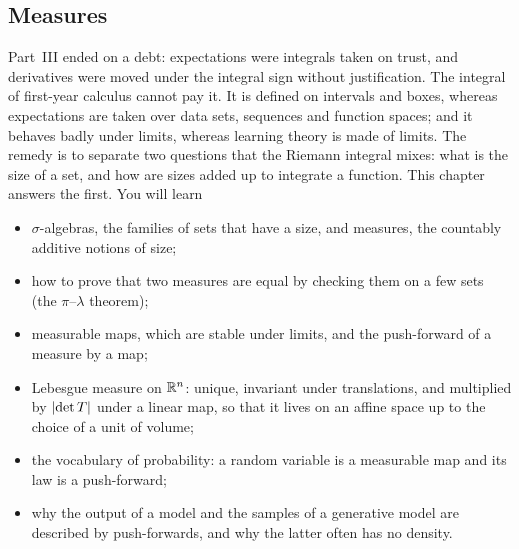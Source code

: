 \begin{notechapter}
\chapter{Measures}
\label{ch:measures}

\begin{chapterintro}
Part~III ended on a debt: expectations were integrals taken on trust,
and derivatives were moved under the integral sign without
justification. The integral of first-year calculus cannot pay it. It is
defined on intervals and boxes, whereas expectations are taken over
data sets, sequences and function spaces; and it behaves badly under
limits, whereas learning theory is made of limits. The remedy is to
separate two questions that the Riemann integral mixes: what is the size
of a set, and how are sizes added up to integrate a function. This
chapter answers the first. You will learn
\begin{itemize}[nosep]
  \item $\sigma$-algebras, the families of sets that have a size, and
        measures, the countably additive notions of size;
  \item how to prove that two measures are equal by checking them on a
        few sets (the $\pi$--$\lambda$ theorem);
  \item measurable maps, which are stable under limits, and the
        push-forward of a measure by a map;
  \item Lebesgue measure on $\mathbb{R}^n$: unique, invariant under
        translations, and multiplied by $\left|\det T\right|$ under a linear
        map, so that it lives on an affine space up to the choice of a
        unit of volume;
  \item the vocabulary of probability: a random variable is a
        measurable map and its law is a push-forward;
  \item why the output of a model and the samples of a generative model
        are described by push-forwards, and why the latter often has no
        density.
\end{itemize}
\end{chapterintro}


\end{notechapter}
